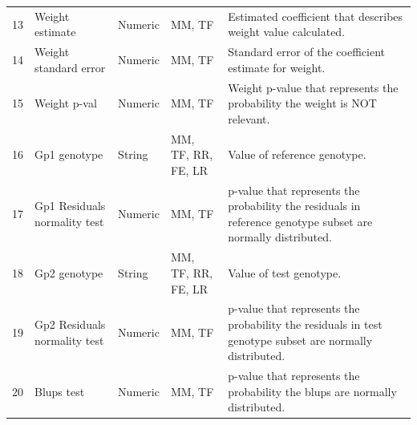 \documentclass[12pt,a4paper]{article}
\begin{document}
\begin{table}
\begin{tabular}{| l | l | l | l | p{10cm} |}
13&Weight estimate&Numeric&MM, TF&Estimated coefficient that describes weight value calculated.\\
14&Weight standard error&Numeric&MM, TF&Standard error of the coefficient estimate for weight.\\
15&Weight p-val&Numeric&MM, TF&Weight p-value that represents the probability the weight is NOT relevant.\\
16&Gp1 genotype&String&MM, TF, RR, FE, LR&Value of reference genotype.\\
17&Gp1 Residuals normality test&Numeric&MM, TF&p-value that represents the probability the residuals in reference genotype subset are normally distributed.\\
18&Gp2 genotype&String&MM, TF, RR, FE, LR&Value of test genotype.\\
19&Gp2 Residuals normality test&Numeric&MM, TF&p-value that represents the probability the residuals in test genotype subset are normally distributed.\\
20&Blups test&Numeric&MM, TF&p-value that represents the probability the blups are normally distributed.\\
\hline  
\end{tabular}
\end{table}
\end{document}

